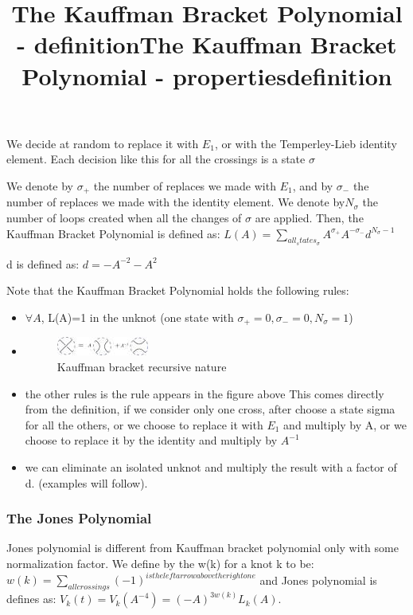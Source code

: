 \documentclass{article}
\begin{document}
We decide at random to replace it with $E_{1}$, or with the Temperley-Lieb identity element.
Each decision like this for all the crossings is a state $\sigma$

\title{The Kauffman Bracket Polynomial - definition} 
We denote by $\sigma_{+}$ the number of replaces we made with $E_{1}$, and by 
$\sigma_{-}$ the number of replaces we made with the identity element.
We denote by$N_{\sigma}$ the number of loops created when all the changes of $\sigma$ are applied.
Then, the Kauffman Bracket Polynomial is defined as:
$ L(A) = \sum\limits_{all_states_\sigma}{A^{\sigma_{+}} A^{-\sigma_{-}}d^{N_{\sigma} - 1}}$

d is defined as: $d = -A^{-2} -A^2$ 



\title{The Kauffman Bracket Polynomial - properties} 
Note that the  Kauffman Bracket Polynomial holds the following rules:
\begin{itemize}
\item $\forall A$, L(A)=1 in the unknot (one state with $\sigma_{+}=0,\sigma_{-}=0, N_{\sigma} = 1$)
\item 
\begin{figure}
\includegraphics[scale=1]{Kauffman_bracket_identity} 
\caption{Kauffman bracket recursive nature}
\end{figure}
\item the other rules is the rule appears in the figure above
This comes directly from the definition, if we consider only one cross, after choose a state sigma for all the others, or we choose to replace it with $E_{1}$ and multiply by A, or we choose to replace it by the identity and multiply by $A^{-1}$
\item we can eliminate an isolated unknot and multiply the result with a factor of d. (examples will follow). 
\end{itemize}


\subsubsection{The Jones Polynomial}
\title{definition}
Jones polynomial is different from Kauffman bracket polynomial only with some normalization factor.
We define by the w(k) for a knot k to be: $w(k) = \sum\limits_{all crossings}{(-1)^{is the left arrow above the right one}}$
and Jones polynomial is defines as: $V_{k}(t)=V_{k}(A^{-4})=(-A)^{3w(k)}L_{k}(A)$.
\end{document}
